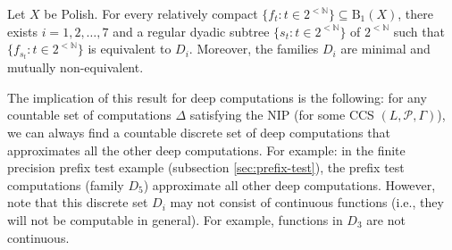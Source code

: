 \begin{theorem}
    Let $X$ be Polish.
    For every relatively compact $\{f_{t}:t\in 2^{<\mathbb{N}}\}\subseteq \mathrm{B}_1(X)$, there exists $i=1,2,\dots, 7$ and a regular dyadic subtree $\{s_t:t\in 2^{<\mathbb{N}}\}$ of $2^{<\mathbb{N}}$ such that $\{f_{s_t}:t\in 2^{<\mathbb{N}}\}$ is equivalent to $D_i$.
    Moreover, the families $D_i$ are minimal and mutually non-equivalent.
\end{theorem}

The implication of this result for deep computations is the following: 
for any countable set of computations $\Delta$ satisfying the NIP (for some CCS $(L,\mathcal{P},\Gamma)$), we can always find a countable discrete set of deep computations that approximates all the other deep computations.
For example: in the finite precision prefix test example (subsection \ref{sec:prefix-test}), the prefix test computations (family $D_5$) approximate all other deep computations.
However, note that this discrete set $D_i$ may not consist of continuous functions (i.e., they will not be computable in general).
For example, functions in $D_3$ are not continuous.